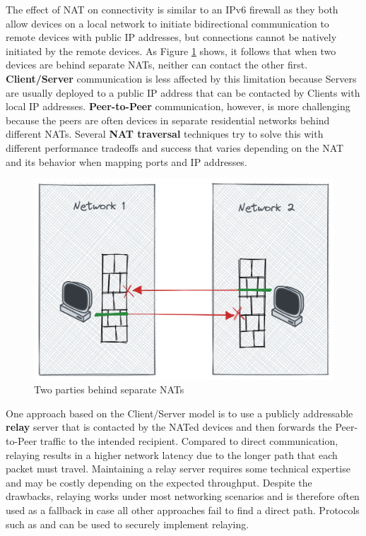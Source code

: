 The effect of NAT on connectivity is similar to an IPv6 firewall as they both allow devices on a local network to initiate bidirectional communication to remote devices with public IP addresses, but connections cannot be natively initiated by the remote devices. As Figure \ref{nat-intro} shows, it follows that when two devices are behind separate NATs, neither can contact the other first. \textbf{Client/Server} communication is less affected by this limitation because Servers are usually deployed to a public IP address that can be contacted by Clients with local IP addresses. \textbf{Peer-to-Peer} communication, however, is more challenging because the peers are often devices in separate residential networks behind different NATs. Several \textbf{NAT traversal} techniques try to solve this with different performance tradeoffs and success that varies depending on the NAT \autocite{natBehaviorRFC} and its behavior when mapping ports and IP addresses. 

\begin{figure}
\centering
\includegraphics[width=\textwidth,height=0.25\textheight]{thesis/../figures/nat-intro.png}
\caption{Two parties behind separate NATs\label{nat-intro}}
\end{figure}

One approach based on the Client/Server model is to use a publicly addressable \textbf{relay} server that is contacted by the NATed devices and then forwards the Peer-to-Peer traffic to the intended recipient. Compared to direct communication, relaying results in a higher network latency due to the longer path that each packet must travel. Maintaining a relay server requires some technical expertise and may be costly depending on the expected throughput. Despite the drawbacks, relaying works under most networking scenarios and is therefore often used as a fallback in case all other approaches fail to find a direct path. Protocols such as  \autocite{turnRFC} and  \autocite{derpDocs} can be used to securely implement relaying.

